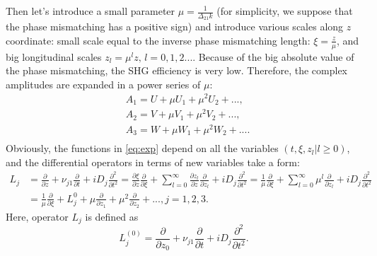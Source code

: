 \documentclass[a4paper, 12pt, onecolumn]{extarticle}
\begin{document}
Then let's introduce a small parameter \(\mu=\frac{1}{\Delta_{21}k}\) (for simplicity, we suppose that the phase mismatching has a positive sign) and introduce various scales along \(z\) coordinate: small scale equal to the inverse phase mismatching length: \(\xi=\frac{z}{\mu}\), and big longitudinal scales \(z_l=\mu^lz,\,l=0,1,2...\). Because of the big absolute value of the phase mismatching, the SHG efficiency is very low. Therefore, the complex amplitudes are expanded in a power series of \(\mu\):
\begin{equation}
\label{eq:exp}
\begin{aligned}
&A_1=U+\mu U_1 +\mu^2 U_2 +...,\\
&A_2=V+\mu V_1 + \mu^2 V_2 +...,\\
&A_3=W+\mu W_1 + \mu^2 W_2+....\\
\end{aligned}
\end{equation}
Obviously, the functions in \eqref{eq:exp} depend on all the variables \((t,\xi,z_l|l\ge0)\), and
the differential operators in terms of new variables take a form:
\begin{equation}
\label{eq:op}
\begin{aligned}
L_j&=\frac{\partial}{\partial z}+\nu_{j1}\frac{\partial}{\partial t}+iD_j\frac{\partial^2}{\partial t^2}=\frac{\partial \xi}{\partial z}\frac{\partial}{\partial \xi}+\sum\limits_{l=0}^{\infty}\frac{\partial z_l}{\partial z}\frac{\partial}{\partial z_l}+iD_j\frac{\partial^2}{\partial t^2}=\frac{1}{\mu}\frac{\partial}{\partial \xi}+\sum\limits_{l=0}^{\infty} \mu^l\frac{\partial}{\partial z_l}+iD_j\frac{\partial^2}{\partial t^2}\\
&=\frac{1}{\mu}\frac{\partial}{\partial \xi}+L_j^{0}+\mu\frac{\partial}{\partial z_1}+\mu^2 \frac{\partial}{\partial z_2}+...,j=1,2,3.
\end{aligned}
\end{equation}
Here, operator \(L_j\) is defined as 
\[L_j^{(0)}=\frac{\partial}{\partial z_0}+\nu_{j1}\frac{\partial}{\partial t}+ iD_j\frac{\partial^2}{\partial t^2}.\]
\end{document}

